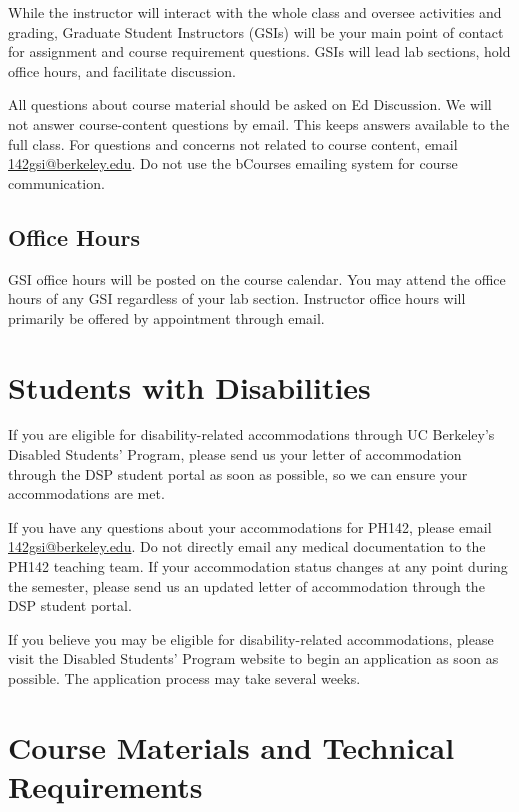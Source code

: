 \documentclass[11pt]{article}
\begin{document}
While the instructor will interact with the whole class and oversee activities
and grading, Graduate Student Instructors (GSIs) will be your main point of
contact for assignment and course requirement questions. GSIs will lead lab
sections, hold office hours, and facilitate discussion.

All questions about course material should be asked on Ed Discussion. We will
not answer course-content questions by email. This keeps answers available to
the full class. For questions and concerns not related to course content, email
\href{mailto:142gsi@berkeley.edu}{142gsi@berkeley.edu}. Do not use the bCourses emailing
system for course communication.

\subsection*{Office Hours}

GSI office hours will be posted on the course calendar. You may attend the
office hours of any GSI regardless of your lab section. Instructor office hours
will primarily be offered by appointment through email.

\section*{Students with Disabilities}

If you are eligible for disability-related accommodations through UC Berkeley's
Disabled Students' Program, please send us your letter of accommodation through
the DSP student portal as soon as possible, so we can ensure your accommodations 
are met.

If you have any questions about your accommodations for PH142, 
please email \href{mailto:142gsi@berkeley.edu}{142gsi@berkeley.edu}. Do not 
directly email any medical documentation to the PH142 teaching team. If your 
accommodation status changes at any point during the semester, please send us 
an updated letter of accommodation through the DSP student portal.

If you believe you may be eligible for disability-related accommodations, please visit
the Disabled Students' Program website to begin an application as soon as possible. 
The application process may take several weeks.

\section*{Course Materials and Technical Requirements}
\end{document}
